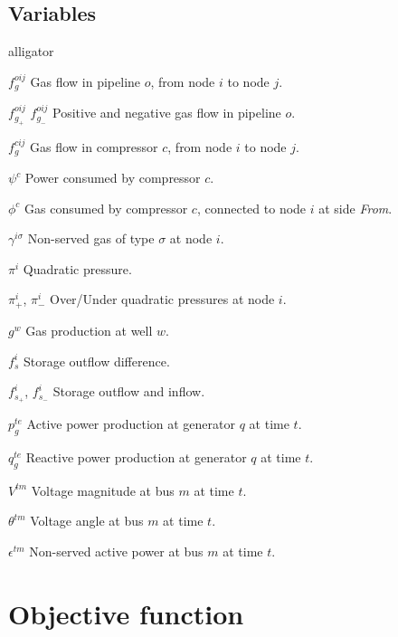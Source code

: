 \subsection*{Variables}

\begin{labeling}{alligator}
\item [${f}_{g}^{oij}$] Gas flow in pipeline $o$, from node $i$ to node $j$.
\item [${f}_{g_+}^{oij}$ ${f}_{g_-}^{oij}$] Positive and negative gas flow in pipeline $o$.
\item [${f}_{g}^{cij}$] Gas flow in compressor $c$, from node $i$ to node $j$.
\item [$\psi^{c}$] Power consumed by compressor $c$.
\item [$\phi^{c}$] Gas consumed by compressor $c$, connected to node $i$ at side \textit{From}.
\item [$\gamma^{i \sigma}$] Non-served gas of type $\sigma$ at node $i$.
\item [$\pi^{i}$] Quadratic pressure.
\item [${\pi}^{i}_{+}$, ${\pi}^{i}_{-}$] Over/Under quadratic pressures at node $i$.
\item [$g^{w}$] Gas production at well $w$.
\item [$f_{s}^{i}$] Storage outflow difference.
\item [$f_{s_+}^{i}$, $f_{s_-}^{i}$] Storage outflow and inflow.
\item [$p_{g}^{te}$] Active power production at generator $q$ at time $t$.
\item [$q_{g}^{te}$] Reactive power production at generator $q$ at time $t$.
\item [$V^{tm}$] Voltage magnitude at bus $m$ at time $t$.
\item [$\theta^{tm}$] Voltage angle at bus $m$ at time $t$.
\item [$\epsilon^{tm}$] Non-served active power at bus $m$ at time $t$.
\end{labeling}


\section{Objective function}


